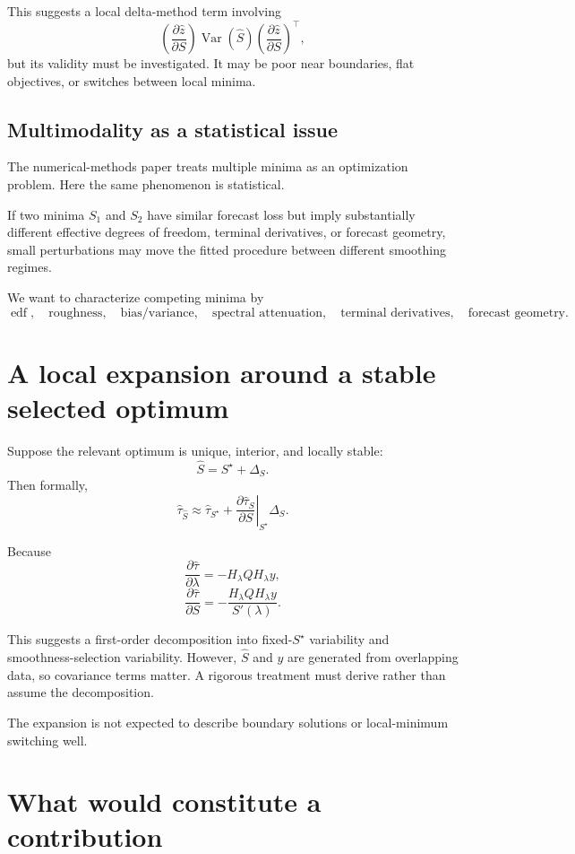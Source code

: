 \documentclass[11pt]{article}
\newcommand{\Var}{\operatorname{Var}}
\begin{document}
This suggests a local delta-method term involving
\[
\left(
\frac{\partial\widehat z}{\partial S}
\right)
\Var(\widehat S)
\left(
\frac{\partial\widehat z}{\partial S}
\right)^\top,
\]
but its validity must be investigated. It may be poor near boundaries, flat
objectives, or switches between local minima.

\subsection{Multimodality as a statistical issue}

The numerical-methods paper treats multiple minima as an optimization problem.
Here the same phenomenon is statistical.

If two minima \(S_1\) and \(S_2\) have similar forecast loss but imply
substantially different effective degrees of freedom, terminal derivatives, or
forecast geometry, small perturbations may move the fitted procedure between
different smoothing regimes.

We want to characterize competing minima by
\[
\operatorname{edf},
\quad
\text{roughness},
\quad
\text{bias/variance},
\quad
\text{spectral attenuation},
\quad
\text{terminal derivatives},
\quad
\text{forecast geometry}.
\]

\section{A local expansion around a stable selected optimum}

Suppose the relevant optimum is unique, interior, and locally stable:
\[
\widehat S=S^\star+\Delta_S.
\]
Then formally,
\[
\widehat\tau_{\widehat S}
\approx
\widehat\tau_{S^\star}
+
\left.
\frac{\partial\widehat\tau_S}{\partial S}
\right|_{S^\star}
\Delta_S.
\]

Because
\[
\frac{\partial\widehat\tau}{\partial\lambda}
=
-H_\lambda QH_\lambda y,
\]
\[
\boxed{
\frac{\partial\widehat\tau}{\partial S}
=
-\frac{H_\lambda QH_\lambda y}{S'(\lambda)}.
}
\]

This suggests a first-order decomposition into fixed-\(S^\star\) variability
and smoothness-selection variability. However, \(\widehat S\) and \(y\) are
generated from overlapping data, so covariance terms matter. A rigorous
treatment must derive rather than assume the decomposition.

The expansion is not expected to describe boundary solutions or local-minimum
switching well.

\section{What would constitute a contribution}
\end{document}

